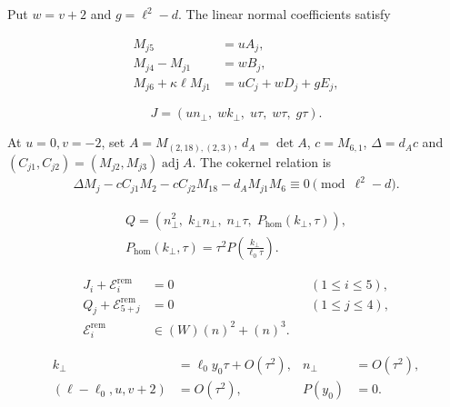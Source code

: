 Put $w=v+2$ and $g=\ell^2-d$. The linear normal coefficients satisfy

\begin{equation}\label{supp:appr3tau:linearmodule}
 \begin{aligned}
 M_{j5}&=uA_j,\\
 M_{j4}-M_{j1}&=wB_j,\\
 M_{j6}+\kappa\ell M_{j1}&=uC_j+wD_j+gE_j,
 \end{aligned}
\end{equation}

\begin{equation}\label{supp:appr3tau:J}
 J=(un_\perp,\;w k_\perp,\;u\tau,\;w\tau,\;g\tau).
\end{equation}

At $u=0,v=-2$, set $A=M_{(2,18),(2,3)}$, $d_A=\det A$,
$c=M_{6,1}$, $\Delta=d_Ac$ and
$(C_{j1},C_{j2})=(M_{j2},M_{j3})\operatorname{adj}A$.
The cokernel relation is
\begin{equation}\label{supp:appr3tau:rangeidentity}
 \begin{aligned}
 \Delta M_j-cC_{j1}M_2-cC_{j2}M_{18}
              -d_AM_{j1}M_6\equiv0\pmod{\ell^2-d}.
 \end{aligned}
\end{equation}

\begin{equation}\label{supp:appr3tau:Q}
 \begin{gathered}
 Q=(n_\perp^2,\;k_\perp n_\perp,\;n_\perp\tau,\;P_{\mathrm{hom}}(k_\perp,\tau)),\\
 P_{\mathrm{hom}}(k_\perp,\tau)=\tau^2P\left(\frac{k_\perp}{\ell_0\tau}\right).
 \end{gathered}
\end{equation}

\begin{equation}\label{supp:appr3tau:relativeform}
 \begin{aligned}
 J_i+\mathcal E_i^{\mathrm{rem}}&=0 &&(1\le i\le5),\\
 Q_j+\mathcal E_{5+j}^{\mathrm{rem}}&=0 &&(1\le j\le4),\\
 \mathcal E_i^{\mathrm{rem}}&\in(W)(n)^2+(n)^3.
 \end{aligned}
\end{equation}

\begin{equation}\label{supp:appr3tau:bounds}
 \begin{aligned}
 k_\perp&=\ell_0y_0\tau+O(\tau^2),& n_\perp&=O(\tau^2),\\
 (\ell-\ell_0,u,v+2)&=O(\tau^2),&P(y_0)&=0.
 \end{aligned}
\end{equation}

